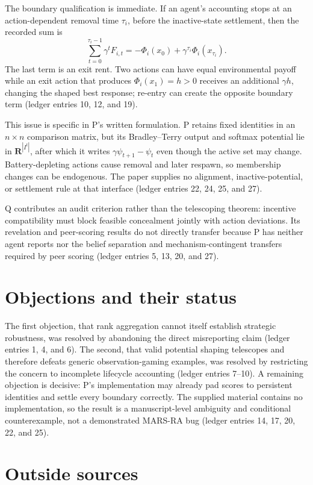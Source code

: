 \documentclass{article}
\begin{document}
The boundary qualification is immediate. If an agent's accounting stops at
an action-dependent removal time \(\tau_i\), before the inactive-state
settlement, then the recorded sum is
\[
\sum_{t=0}^{\tau_i-1}\gamma^tF_{i,t}
=-\Phi_i(x_0)+\gamma^{\tau_i}\Phi_i(x_{\tau_i}).
\]
The last term is an exit rent. Two actions can have equal environmental payoff
while an exit action that produces \(\Phi_i(x_1)=h>0\) receives an additional
\(\gamma h\), changing the shaped best response; re-entry can create the
opposite boundary term (ledger entries 10, 12, and 19).

This issue is specific in P's written formulation. P retains fixed identities
in an \(n\times n\) comparison matrix, but its Bradley--Terry output and
softmax potential lie in \(\mathbf{R}^{|I^t|}\), after which it writes
\(\gamma\psi_{t+1}-\psi_t\) even though the active set may change.
Battery-depleting actions cause removal and later respawn, so membership
changes can be endogenous. The paper supplies no alignment, inactive-potential,
or settlement rule at that interface (ledger entries 22, 24, 25, and 27).

Q contributes an audit criterion rather than the telescoping theorem: incentive compatibility must block feasible concealment jointly with action deviations. Its revelation and peer-scoring results do not directly transfer because P has neither agent reports nor the belief separation and mechanism-contingent transfers required by peer scoring (ledger entries 5, 13, 20, and 27).

\section{Objections and their status}

The first objection, that rank aggregation cannot itself establish strategic robustness, was resolved by abandoning the direct misreporting claim (ledger entries 1, 4, and 6). The second, that valid potential shaping telescopes and therefore defeats generic observation-gaming examples, was resolved by restricting the concern to incomplete lifecycle accounting (ledger entries 7--10). A remaining objection is decisive: P's implementation may already pad scores to persistent identities and settle every boundary correctly. The supplied material contains no implementation, so the result is a manuscript-level ambiguity and conditional counterexample, not a demonstrated MARS-RA bug (ledger entries 14, 17, 20, 22, and 25).

\section{Outside sources}
\end{document}
